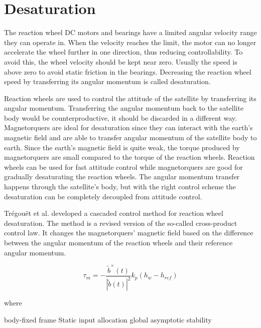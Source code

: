\section{Desaturation}

The reaction wheel DC motors and bearings have a limited angular velocity range they can operate in. When the velocity reaches the limit, the motor can no longer accelerate the wheel further in one direction, thus reducing controllability. To avoid this, the wheel velocity should be kept near zero. Usually the speed is above zero to avoid static friction in the bearings. Decreasing the reaction wheel speed by transferring its angular momentum is called desaturation.

Reaction wheels are used to control the attitude of the satellite by transferring its angular momentum. Transferring the angular momentum back to the satellite body would be counterproductive, it should be discarded in a different way. Magnetorquers are ideal for desaturation since they can interact with the earth's magnetic field and are able to transfer angular momentum of the satellite body to earth. Since the earth's magnetic field is quite weak, the torque produced by magnetorquers are small compared to the torque of the reaction wheels. Reaction wheels can be used for fast attitude control while magnetorquers are good for gradually desaturating the reaction wheels. The angular momentum transfer happens through the satellite's body, but with the right control scheme the desaturation can be  completely decoupled from attitude control.

Trégouët et al. \cite{DesatTregouet} developed a cascaded control method for reaction wheel desaturation. The method is a revised version of the so-called cross-product control law. It changes the magnetorquers' magnetic field based on the difference between the angular momentum of the reaction wheels and their reference angular momentum.

\begin{equation}
\tau_m = -\frac{\tilde{b}^\times(t)}{|\tilde{b}(t) |^2} k_p\left(h_w - h_{ref} \right)
\end{equation}

where  



body-fixed frame
Static input allocation
global asymptotic stability


\cite{DesatYang}